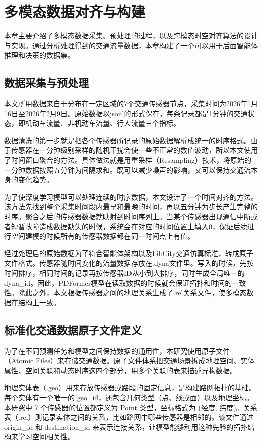
\chapter{多模态数据对齐与构建}

本章主要介绍了多模态数据采集、预处理的过程，以及跨模态时空对齐算法的设计与实现。通过分析处理得到的交通流量数据，本章构建了一个可以用于后面智能体推理和决策的数据集。

\section{数据采集与预处理}

本文所用数据来自于分布在一定区域的7个交通传感器节点，采集时间为2026年1月16日至2026年2月9日。原始数据以jsonl的形式保存，每条记录都是1分钟的交通状态，即机动车流量、非机动车流量、行人流量三个指标。

数据清洗的第一步就是把各个传感器所记录的原始数据解析成统一的时序格式。由于传感器在一分钟级别采样的随机干扰会使一些不正常的数值波动，所以本文使用了时间窗口聚合的方法。具体做法就是用重采样（Resampling）技术，将原始的一分钟数据按照五分钟为间隔求和。既可以减少噪声的影响，又可以保持交通流本身的变化趋势。

为了使深度学习模型可以处理连续的时序数据，本文设计了一个时间对齐的方法。该方法先找到整个采集时间段内最早和最晚的时间，再以五分钟为步长产生完整的时序。聚合之后的传感器数据就映射到时间序列上。当某个传感器出现通信中断或者短暂故障造成数据缺失的时候，系统会在对应的时间位置上填入0，保证后续进行空间建模的时候所有的传感器数据都在同一时间点上有值。

经过处理后的原始数据为了符合智能体架构以及LibCity交通仿真标准，转成原子文件格式。传感器随时间变化的流量数据存放在.dyna文件里。写入的时候，先按时间排序，相同时间的记录再按传感器ID从小到大排序，同时生成全局唯一的dyna\_id。因此，PDFormer模型在读取数据的时候就会保证拓扑和时间的一致性。除此之外，本文根据传感器之间的地理关系生成了.rel关系文件，使多模态数据在结构上一致。

\section{标准化交通数据原子文件定义}

为了在不同预测任务和模型之间保持数据的通用性，本研究使用原子文件（Atomic Files）来存储交通数据。原子文件体系把交通场景拆成地理空间、实体属性、空间关联和动态时序这四个部分，用多个关联的表来描述异构数据。

地理实体表（.geo）用来存放传感器或路段的固定信息，是构建路网拓扑的基础。每个实体有一个唯一的 geo\_id，还包含几何类型（点、线或面）以及地理坐标。本研究中 7 个传感器的位置都定义为 Point 类型，坐标格式为 (经度, 纬度)。关系表（.rel）则记录实体之间的关系，比如路网中哪些传感器是相邻的。该文件通过 origin\_id 和 destination\_id 来表示连接关系，让模型能够利用这种先验的拓扑结构来学习空间相关性。

